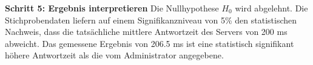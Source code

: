 \textbf{Schritt 5: Ergebnis interpretieren}
Die Nullhypothese $H_0$ wird abgelehnt. Die Stichprobendaten liefern auf einem Signifikanzniveau von 5\% den statistischen Nachweis, dass die tatsächliche mittlere Antwortzeit des Servers von 200 ms abweicht. Das gemessene Ergebnis von 206.5 ms ist eine statistisch signifikant höhere Antwortzeit als die vom Administrator angegebene.